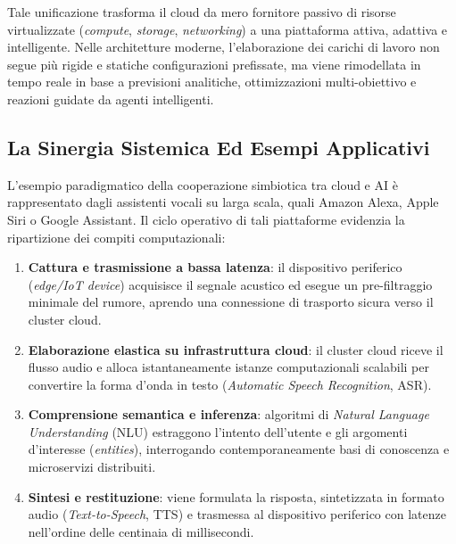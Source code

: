 \documentclass[11pt, a4paper]{article}
\begin{document}

Tale unificazione trasforma il cloud da mero fornitore passivo di risorse virtualizzate (\emph{compute}, \emph{storage}, \emph{networking}) a una piattaforma attiva, adattiva e intelligente. Nelle architetture moderne, l'elaborazione dei carichi di lavoro non segue più rigide e statiche configurazioni prefissate, ma viene rimodellata in tempo reale in base a previsioni analitiche, ottimizzazioni multi-obiettivo e reazioni guidate da agenti intelligenti.


\subsection{La Sinergia Sistemica Ed Esempi Applicativi}

L'esempio paradigmatico della cooperazione simbiotica tra cloud e AI è rappresentato dagli assistenti vocali su larga scala, quali Amazon Alexa, Apple Siri o Google Assistant. Il ciclo operativo di tali piattaforme evidenzia la ripartizione dei compiti computazionali:
\begin{enumerate}
    \item \textbf{Cattura e trasmissione a bassa latenza}: il dispositivo periferico (\emph{edge/IoT device}) acquisisce il segnale acustico ed esegue un pre-filtraggio minimale del rumore, aprendo una connessione di trasporto sicura verso il cluster cloud.
    \item \textbf{Elaborazione elastica su infrastruttura cloud}: il cluster cloud riceve il flusso audio e alloca istantaneamente istanze computazionali scalabili per convertire la forma d'onda in testo (\emph{Automatic Speech Recognition}, ASR).
    \item \textbf{Comprensione semantica e inferenza}: algoritmi di \emph{Natural Language Understanding} (NLU) estraggono l'intento dell'utente e gli argomenti d'interesse (\emph{entities}), interrogando contemporaneamente basi di conoscenza e microservizi distribuiti.
    \item \textbf{Sintesi e restituzione}: viene formulata la risposta, sintetizzata in formato audio (\emph{Text-to-Speech}, TTS) e trasmessa al dispositivo periferico con latenze nell'ordine delle centinaia di millisecondi.
\end{enumerate}
\end{document}
